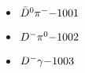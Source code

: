 
 \begin{multicols}{3} 
 \begin{itemize}
 \item $ \bar{D}^{0} \pi^{-} \hfill{-1001}$
 \item $ D^{-} \pi^{0} \hfill{-1002}$
 \item $ D^{-} \gamma \hfill{-1003}$
 \end{itemize} 
 \end{multicols} 
